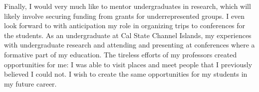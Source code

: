 \documentclass[11pt]{article}
\begin{document}
Finally, I would very much like to mentor undergraduates in research,
which will likely involve securing funding from grants for
underrepresented groups. I even look forward to with anticipation my
role in organizing trips to conferences for the students. As an
undergraduate at Cal State Channel Islands, my experiences with
undergraduate research and attending and presenting at conferences where
a formative part of my education. The tireless efforts of my professors
created opportunities for me: I was able to visit places and meet people
that I previously believed I could not. I wish to create the same
opportunities for my students in my future career.

\label{page:last}
\end{document}
